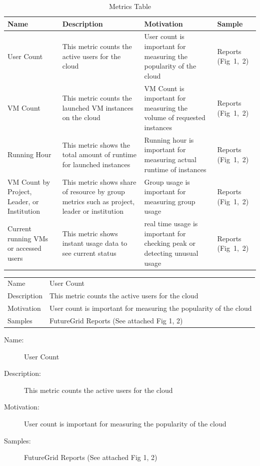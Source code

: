 \documentclass{sig-alternate-05-2015}
\begin{document}
\begin{table}[htb]

\caption{Metrics Table}
{\scriptsize
\label{T:metrics}
\bigskip
\begin{tabular}{p{}p{}p{}p{}}
Name & Description & Motivation & Sample \\
\hline
User Count & 
This metric counts the active users for the cloud &
User count is important for measuring the popularity of the cloud & 
Reports (Fig~1,~2) \\
\hline
VM Count & 
This metric counts the launched VM instances on the cloud &
VM Count is important for measuring the volume of requested instances &
Reports (Fig~1,~2) \\
\hline
Running Hour &
This metric shows the total amount of runtime for launched instances &
Running hour is important for measuring actual runtime of instances &
Reports (Fig~1,~2) \\
\hline
VM Count by Project, Leader, or Institution &
This metric shows share of resource by group metrics such as project, leader or institution &
Group usage is important for measuring group usage &
Reports (Fig~1,~2) \\
\hline
Current running VMs or accessed users &
This metric shows instant usage data to see current status &
real time usage is important for checking peak or detecting unusual usage &
Reports (Fig~1,~2) \\
\hline
\end{tabular}
}
\end{table}



\flushleft
\begin{tabular}{p{}p{}}
{\bf\it\small} Name &  User Count \\
{\bf\it\small} Description & This metric counts the active users for the cloud \\
{\bf\it\small} Motivation & User count is important for measuring the popularity of the cloud\\
{\bf\it\small} Samples & FutureGrid Reports (See attached Fig 1, 2) \\
\end{tabular}


\begin{description}
\item[Name:] User Count
\item[Description:] This metric counts the active users for the cloud
\item[Motivation:] User count is important for measuring the popularity of the cloud
\item[Samples:] FutureGrid Reports (See attached Fig 1, 2)
\end{description}
  
\end{document}

